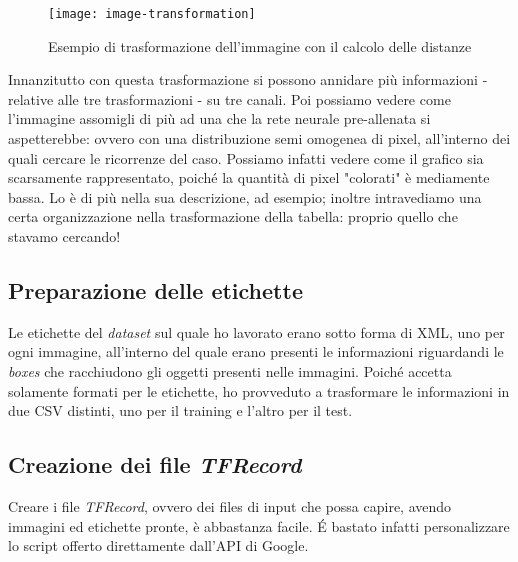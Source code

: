     \begin{figure}[H] 
        \centering
        \texttt{[image: image-transformation]} 
        \caption{Esempio di trasformazione dell'immagine con il calcolo delle distanze}
        \label{img:distance-transformation}
    \end{figure}
    Innanzitutto con questa trasformazione si possono annidare più informazioni - relative alle tre trasformazioni - su tre canali. Poi possiamo vedere come l'immagine assomigli di più ad una che la rete neurale pre-allenata si aspetterebbe: ovvero con una distribuzione semi omogenea di pixel, all'interno dei quali cercare le ricorrenze del caso. Possiamo infatti vedere come il grafico sia scarsamente rappresentato, poiché la quantità di pixel "colorati" è mediamente bassa. Lo è di più nella sua descrizione, ad esempio; inoltre intravediamo una certa organizzazione nella trasformazione della tabella: proprio quello che stavamo cercando!
    
    \subsection{Preparazione delle etichette}
    Le etichette del \textit{dataset} sul quale ho lavorato erano sotto forma di XML, uno per ogni immagine, all'interno del quale erano presenti le informazioni riguardandi le \textit{boxes} che racchiudono gli oggetti presenti nelle immagini. Poiché  accetta solamente formati \cite{prod:pandas} per le etichette, ho provveduto a trasformare le informazioni in due CSV distinti, uno per il training e l'altro per il test.
    
    \subsection{Creazione dei file \textit{TFRecord}}
    Creare i file \textit{TFRecord}, ovvero dei files di input che  possa capire, avendo immagini ed etichette pronte, è abbastanza facile. \'E bastato infatti personalizzare lo script\cite{site:generate-tfrecord} offerto direttamente dall'API di Google.
    

